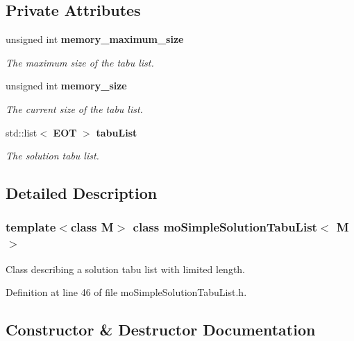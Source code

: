 \subsection*{Private Attributes}
\begin{CompactItemize}
\item 
unsigned int {\bf memory\_\-maximum\_\-size}\label{classmo_simple_solution_tabu_list_r0}

\begin{CompactList}\small\item\em The maximum size of the tabu list. \item\end{CompactList}\item 
unsigned int {\bf memory\_\-size}\label{classmo_simple_solution_tabu_list_r1}

\begin{CompactList}\small\item\em The current size of the tabu list. \item\end{CompactList}\item 
std::list$<$ {\bf EOT} $>$ {\bf tabu\-List}\label{classmo_simple_solution_tabu_list_r2}

\begin{CompactList}\small\item\em The solution tabu list. \item\end{CompactList}\end{CompactItemize}


\subsection{Detailed Description}
\subsubsection*{template$<$class M$>$ class mo\-Simple\-Solution\-Tabu\-List$<$ M $>$}

Class describing a solution tabu list with limited length. 



Definition at line 46 of file mo\-Simple\-Solution\-Tabu\-List.h.

\subsection{Constructor \& Destructor Documentation}
